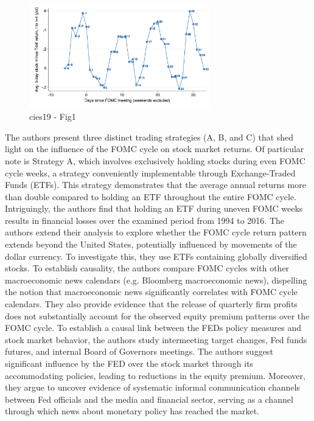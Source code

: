 \begin{figure}[h]
    \centering
    \includegraphics[width=0.7\textwidth]{figures/cies19/fig1}
    \caption{cies19 - Fig1}
\end{figure}


The authors present three distinct trading strategies (A, B, and C) that shed light on the influence of the FOMC cycle on stock market returns. Of particular note is Strategy A, which involves exclusively holding stocks during even FOMC cycle weeks, a strategy conveniently implementable through Exchange-Traded Funds (ETFs). This strategy demonstrates that the average annual returns more than double compared to holding an ETF throughout the entire FOMC cycle. Intriguingly, the authors find that holding an ETF during uneven FOMC weeks results in financial losses over the examined period from 1994 to 2016.
The authors extend their analysis to explore whether the FOMC cycle return pattern extends beyond the United States, potentially influenced by movements of the dollar currency. To investigate this, they use ETFs containing globally diversified stocks. To establish causality, the authors compare FOMC cycles with other macroeconomic news calendars (e.g. Bloomberg macroeconomic news), dispelling the notion that macroeconomic news significantly correlates with FOMC cycle calendars. They also provide evidence that the release of quarterly firm profits does not substantially account for the observed equity premium patterns over the FOMC cycle.
To establish a causal link between the FEDs policy measures and stock market behavior, the authors study intermeeting target changes, Fed funds futures, and internal Board of Governors meetings. 
The authors suggest significant influence by the FED over the stock market through its accommodating policies, leading to reductions in the equity premium. Moreover, they argue to uncover evidence of systematic informal communication channels between Fed officials and the media and financial sector, serving as a channel through which news about monetary policy has reached the market.

